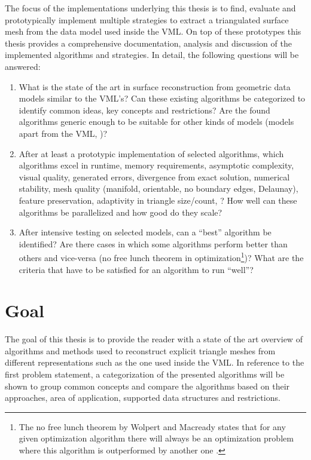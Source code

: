 The focus of the implementations underlying this thesis is to find, evaluate and prototypically implement multiple strategies to extract a triangulated surface mesh from the data model used inside the VML.
On top of these prototypes this thesis provides a comprehensive documentation, analysis and discussion of the implemented algorithms and strategies.
In detail, the following questions will be answered:

\begin{enumerate}
	\item What is the state of the art in surface reconstruction from geometric data models similar to the VML's?
	Can these existing algorithms be categorized to identify common ideas, key concepts and restrictions?
	Are the found algorithms generic enough to be suitable for other kinds of models (models apart from the VML, \cf)?
	
	\item After at least a prototypic implementation of selected algorithms, which algorithms excel in runtime, memory requirements, asymptotic complexity, visual quality, generated errors, divergence from exact solution, numerical stability, mesh quality (manifold, orientable, no boundary edges, Delaunay), feature preservation, adaptivity in triangle size/count, \etc?
	How well can these algorithms be parallelized and how good do they scale?
	
	\item After intensive testing on selected models, can a \enquote{best} algorithm be identified?
	Are there cases in which some algorithms perform better than others and vice-versa (\cf no free lunch theorem in optimization\footnote{The no free lunch theorem by Wolpert and Macready states that for any given optimization algorithm there will always be an optimization problem where this algorithm is outperformed by another one \cite{no_free_lunch}.})?
	What are the criteria that have to be satisfied for an algorithm to run \enquote{well}?
\end{enumerate}


\section{Goal}
\label{sec:goal}

The goal of this thesis is to provide the reader with a state of the art overview of algorithms and methods used to reconstruct explicit triangle meshes from different representations such as the one used inside the VML.
In reference to the first problem statement, a categorization of the presented algorithms will be shown to group common concepts and compare the algorithms based on their approaches, area of application, supported data structures and restrictions.

